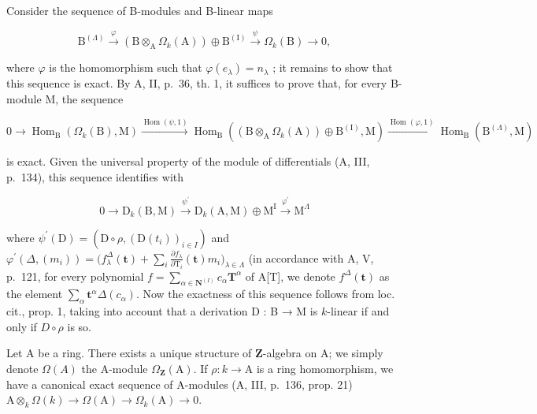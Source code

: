 Consider the sequence of B-modules and B-linear maps

\[
\mathrm{B} ^ {(\Lambda)} \xrightarrow {\varphi} (\mathrm{B} \otimes_ {\mathrm{A}} \Omega_ {k} (\mathrm{A})) \oplus \mathrm{B} ^ {(\mathrm{I})} \xrightarrow {\psi} \Omega_ {k} (\mathrm{B}) \longrightarrow 0,
\]

where \(\varphi\) is the homomorphism such that \(\varphi(e_{\lambda}) = n_{\lambda}\) ; it remains to show that this sequence is exact. By A, II, p.~36, th. 1, it suffices to prove that, for every B-module M, the sequence

\[
0 \to \operatorname{Hom} _ {\mathrm{B}} (\Omega _{k}(\mathrm{B}), \mathrm{M}) \xrightarrow {\operatorname{Hom}(\psi,1)} \operatorname{Hom} _{\mathrm{B}} ((\mathrm{B} \otimes_{\mathrm{A}} \Omega _{k}(\mathrm{A})) \oplus \mathrm{B}^{(\mathrm{I})}, \mathrm{M}) \xrightarrow {\operatorname{Hom}(\varphi,1)} \operatorname{Hom}_{\mathrm{B}}(\mathrm{B}^{(\Lambda)}, \mathrm{M})
\]

is exact. Given the universal property of the module of differentials (A, III, p.~134), this sequence identifies with

\[
0 \to \mathrm{D} _ {k} (\mathrm{B}, \mathrm{M}) \xrightarrow {\psi^ {\prime}} \mathrm{D} _ {k} (\mathrm{A}, \mathrm{M}) \oplus \mathrm{M} ^ {\mathrm{I}} \xrightarrow {\varphi^ {\prime}} \mathrm{M} ^ {\Lambda}
\]

where \(\psi^{\prime}(\mathrm{D}) = (\mathrm{D}\circ \rho,(\mathrm{D}(t_{i}))_{i\in I})\) and \(\varphi^{\prime}(\Delta,(m_{i})) = \big(f_{\lambda}^{\Delta}(\mathbf{t}) + \sum_{i}\frac{\partial f_{\lambda}}{\partial\mathrm{T}_{i}}(\mathbf{t})m_{i}\big)_{\lambda \in \Lambda}\) (in accordance with A, V, p.~121, for every polynomial \(f = \sum_{\alpha \in \mathbf{N}^{(I)}}c_{\alpha}\mathbf{T}^{\alpha}\) of A{[}T{]}, we denote \(f^{\Delta}(\mathbf{t})\) as the element \(\sum_{\alpha}\mathbf{t}^{\alpha}\Delta(c_{\alpha})\). Now the exactness of this sequence follows from loc. cit., prop. 1, taking into account that a derivation D : B → M is \(k\)-linear if and only if \(D\circ\rho\) is so.

Let A be a ring. There exists a unique structure of \(\mathbf{Z}\)-algebra on A; we simply denote \(\Omega(A)\) the A-module \(\Omega_{\mathbf{Z}}(\mathrm{A})\). If \(\rho : k \to \mathrm{A}\) is a ring homomorphism, we have a canonical exact sequence of A-modules (A, III, p.~136, prop. 21) \(\mathrm{A} \otimes_k \Omega(k) \to \Omega(\mathrm{A}) \to \Omega_k(\mathrm{A}) \to 0\).

